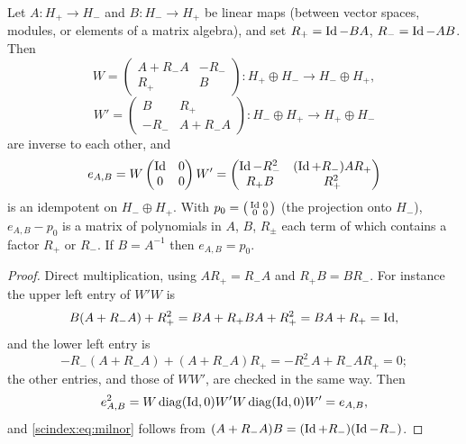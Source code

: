 \begin{lemma}\label{scindex:lem:milnor}
  Let $A:H_+\to H_-$ and $B:H_-\to H_+$ be linear maps (between vector spaces,
  modules, or elements of a matrix algebra), and set $R_+=\operatorname{Id}-BA$,
  $R_-=\operatorname{Id}-AB$. Then
  \begin{equation*}
    W=\begin{pmatrix}A+R_-A&-R_-\\R_+&B\end{pmatrix}:H_+\oplus H_-\to H_-\oplus
    H_+,
  \end{equation*}
  \begin{equation*}
    W'=\begin{pmatrix}B&R_+\\-R_-&A+R_-A\end{pmatrix}:H_-\oplus H_+\to H_+\oplus
    H_-
  \end{equation*}
  are inverse to each other, and
  \begin{equation}\label{scindex:eq:milnor}
    e_{A,B}=W\begin{pmatrix}\operatorname{Id}&0\\0&0\end{pmatrix}W'=
    \begin{pmatrix}\operatorname{Id}-R_-^2&(\operatorname{Id}+R_-)AR_+\\R_+B&R_+^2\end{pmatrix}
  \end{equation}
  is an idempotent on $H_-\oplus H_+$. With $p_0=\bigl(\begin{smallmatrix}\operatorname{Id}&0\\0&0
  \end{smallmatrix}\bigr)$ (the projection onto $H_-$), $e_{A,B}-p_0$ is a
  matrix of polynomials in $A$, $B$, $R_\pm$ each term of which contains a factor
  $R_+$ or $R_-$. If $B=A^{-1}$ then $e_{A,B}=p_0$.
\end{lemma}
\begin{proof}
  Direct multiplication, using $AR_+=R_-A$ and $R_+B=BR_-$. For instance the
  upper left entry of $W'W$ is
  \begin{equation*}
    B(A+R_-A)+R_+^2=BA+R_+BA+R_+^2=BA+R_+=\operatorname{Id},
  \end{equation*}
  and the lower left entry is
  \begin{equation*}
    -R_-(A+R_-A)+(A+R_-A)R_+=-R_-^2A+R_-AR_+=0;
  \end{equation*}
  the other
  entries, and those of $WW'$, are checked in the same way. Then
  \begin{equation*}
    e_{A,B}^2=W\operatorname{diag}(\operatorname{Id},0)W'W\operatorname{diag}(\operatorname{Id},0)W'=e_{A,B},
  \end{equation*}
  and \eqref{scindex:eq:milnor} follows
  from $(A+R_-A)B=(\operatorname{Id}+R_-)(\operatorname{Id}-R_-)$.
\end{proof}


